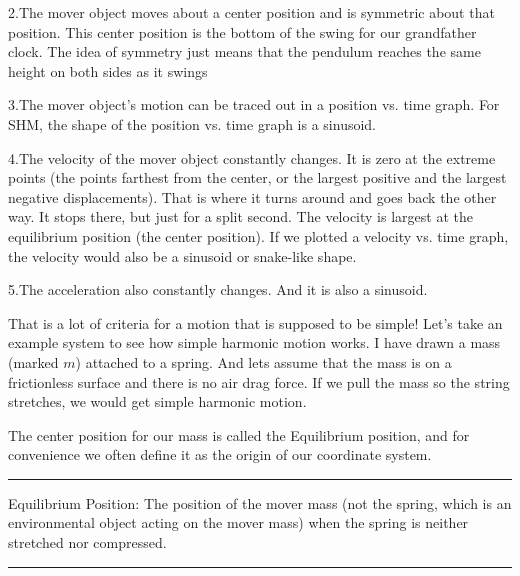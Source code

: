 \documentclass{book}
\begin{document}
2.\qquad The mover object moves about a center position and is symmetric
about that position. This center position is the bottom of the swing for our
grandfather clock. The idea of symmetry just means that the pendulum reaches
the same height on both sides as it swings

3.\qquad The mover object's motion can be traced out in a position vs. time
graph. For SHM, the shape of the position vs. time graph is a sinusoid.

4.\qquad The velocity of the mover object constantly changes. It is zero at
the extreme points (the points farthest from the center, or the largest
positive and the largest negative displacements). That is where it turns
around and goes back the other way. It stops there, but just for a split
second. The velocity is largest at the equilibrium position (the center
position). If we plotted a velocity vs. time graph, the velocity would also
be a sinusoid or snake-like shape.

5.\qquad The acceleration also constantly changes. And it is also a sinusoid.

That is a lot of criteria for a motion that is supposed to be simple! Let's
take an example system to see how simple harmonic motion works. I have drawn
a mass (marked $m$) attached to a spring. And lets assume that the mass is
on a frictionless surface and there is no air drag force. If we pull the
mass so the string stretches, we would get simple harmonic motion.

The center position for our mass
is called the Equilibrium position, and for convenience we often define it
as the origin of our coordinate system.

\begin{center}
\rule{300pt}{1pt}

{\small Equilibrium Position: The position of the mover mass (not the
spring, which is an environmental object acting on the mover mass) when the
spring is neither stretched nor compressed.}

\rule{300pt}{1pt}
\end{center}
\end{document}
